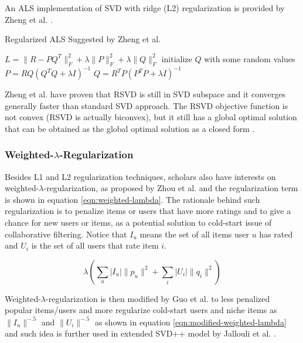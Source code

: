 \documentclass[letter paper, 11pt]{article}
\begin{document}
	An ALS implementation of SVD with ridge (L2) regularization is provided by Zheng et al. \cite{RSVD}.
	
	\renewcommand{\algorithmicrequire}{\textbf{Input:}}
	
	\begin{algorithm}
		\caption{Regularized ALS Suggested by Zheng et al.\cite{RSVD}}
		\label{L1}
		\begin{algorithmic}
			\STATE $L = \| R - P Q^T \|_F^2 + \lambda \| P \|_F^2 + \lambda \| Q \|_F^2$
			\STATE initialize $Q$ with some random values
			\REPEAT
				\STATE $ P = R Q(Q^TQ + \lambda I)^{-1} $
				\STATE $ Q = R^T P(P^T P + \lambda I)^{-1} $
		\end{algorithmic}
	\end{algorithm}

	Zheng et al. \cite{RSVD} have proven that RSVD is still in SVD subspace and it converges generally faster than standard SVD approach. The RSVD objective function is not convex (RSVD is actually biconvex), but it still has a global optimal solution that can be obtained as the global optimal solution as a closed form \cite{RSVD}.
	
	\subsubsection{Weighted-$\lambda$-Regularization}
	Besides L1 and L2 regularization techniques, scholars also have interests on weighted-$\lambda$-regularization, as proposed by Zhou et al. \cite{weighted-lambda-old} and the regularization term is shown in equation \ref{eqn:weighted-lambda}. The rationale behind such regularization is to penalize items or users that have more ratings and to give a chance for new users or items, as a potential solution to cold-start issue of collaborative filtering. Notice that $I_u$ means the set of all items user $u$ has rated and $U_i$ is the set of all users that rate item $i$.
	
	\begin{equation}
		\label{eqn:weighted-lambda}
		\lambda (\sum_u |I_u| \|p_u\|^2 + \sum_i |U_i| \|q_i\|^2)
	\end{equation}
	
	Weighted-$\lambda$-regularization is then modified by Guo et al. \cite{R-Model} to less penalized popular items/users and more regularize cold-start users and niche items as $\|I_u\|^{-.5}$ and $\|U_i\|^{-.5}$ as shown in equation \ref{eqn:modified-weighted-lambda} and such idea is further used in extended SVD++ model by Jallouli et al. \cite{contextual}.
	
\end{document}
